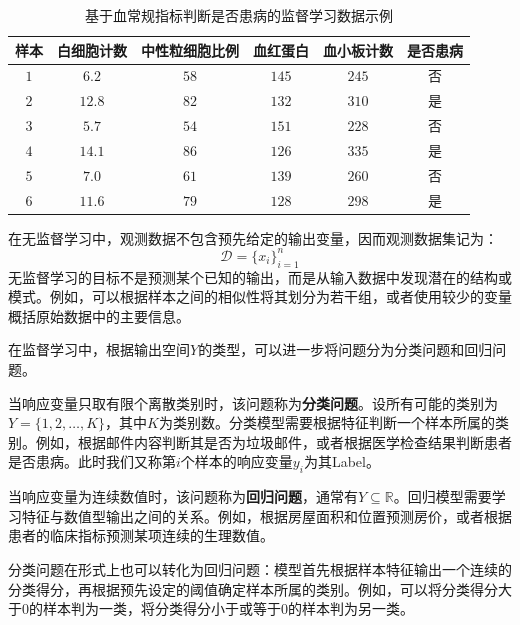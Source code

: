 \begin{table}[H]
	\centering
	\caption{基于血常规指标判断是否患病的监督学习数据示例}
	\label{tab:supervised-learning-example}
	\begin{tabular}{cccccc}
		\toprule
		样本
		&白细胞计数
		&中性粒细胞比例
		&血红蛋白
		&血小板计数
		&是否患病 \\
		\midrule
		$1$ & $6.2$ & $58$ & $145$ & $245$ & 否 \\
		$2$ & $12.8$ & $82$ & $132$ & $310$ & 是 \\
		$3$ & $5.7$ & $54$ & $151$ & $228$ & 否 \\
		$4$ & $14.1$ & $86$ & $126$ & $335$ & 是 \\
		$5$ & $7.0$ & $61$ & $139$ & $260$ & 否 \\
		$6$ & $11.6$ & $79$ & $128$ & $298$ & 是 \\
		\bottomrule
	\end{tabular}
\end{table}\par
在无监督学习中，观测数据不包含预先给定的输出变量，因而观测数据集记为：
\begin{equation*}
	\mathcal{D}=\{x_i\}_{i=1}^n
\end{equation*}
无监督学习的目标不是预测某个已知的输出，而是从输入数据中发现潜在的结构或模式。例如，可以根据样本之间的相似性将其划分为若干组，或者使用较少的变量概括原始数据中的主要信息。\par
在监督学习中，根据输出空间$Y$的类型，可以进一步将问题分为分类问题和回归问题。\par
当响应变量只取有限个离散类别时，该问题称为\textbf{分类问题}。设所有可能的类别为$Y=\{1,2,\dots,K\}$，其中$K$为类别数。分类模型需要根据特征判断一个样本所属的类别。例如，根据邮件内容判断其是否为垃圾邮件，或者根据医学检查结果判断患者是否患病。此时我们又称第$i$个样本的响应变量$y_i$为其\gls{Label}。\par
当响应变量为连续数值时，该问题称为\textbf{回归问题}，通常有$Y\subseteq\mathbb{R}$。回归模型需要学习特征与数值型输出之间的关系。例如，根据房屋面积和位置预测房价，或者根据患者的临床指标预测某项连续的生理数值。\par
分类问题在形式上也可以转化为回归问题：模型首先根据样本特征输出一个连续的分类得分，再根据预先设定的阈值确定样本所属的类别。例如，可以将分类得分大于$0$的样本判为一类，将分类得分小于或等于$0$的样本判为另一类。














